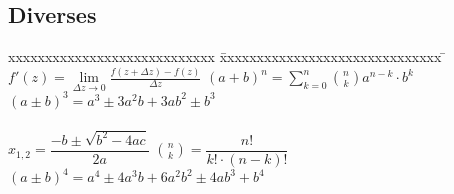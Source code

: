 \subsection{Diverses}
\begin{tabbing}
	xxxxxxxxxxxxxxxxxxxxxxxxxxxx \= xxxxxxxxxxxxxxxxxxxxxxxxxxxxxx \= \kill
 	$f'(z) = \lim \limits_{\Delta z \rightarrow 0} \frac{f(z + \Delta z) -
	f(z)}{\Delta z}$ \> $(a + b)^n = \sum_{k=0}^{n} \binom n k a^{n-k} \cdot b^k$ \>
	$(a \pm b)^3 =a^3 \pm  3 a^{2} b + 3 a b^2 \pm b^3 $\\ \\
	$x_{1,2} = \dfrac{-b \pm \sqrt{b^2 - 4ac}}{2a}$ \> $\binom n k = \dfrac{n!}{k!
	\cdot (n-k)!}$ \> $(a \pm b)^4 =a^4 \pm  4 a^{3} b + 6a^2b^2 \pm 4 a b^3 +
	b^4$\\
\end{tabbing}